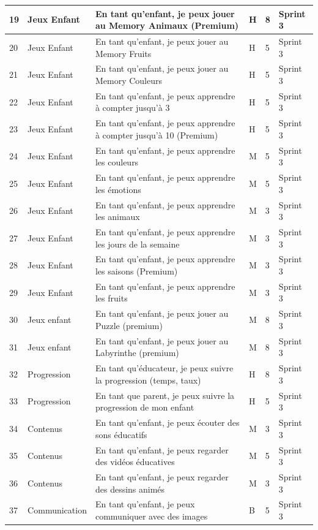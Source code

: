 \documentclass[12pt,a4paper]{report}
\begin{document}
\begin{longtable}{|p{0.5cm}|p{3cm}|p{6cm}|p{1cm}|p{1cm}|p{1.5cm}|}
19 & Jeux Enfant & En tant qu'enfant, je peux jouer au Memory Animaux (Premium) & H & 8 & Sprint 3 \\
\hline
20 & Jeux Enfant & En tant qu'enfant, je peux jouer au Memory Fruits & H & 5 & Sprint 3 \\
\hline
21 & Jeux Enfant & En tant qu'enfant, je peux jouer au Memory Couleurs & H & 5 & Sprint 3 \\
\hline
22 & Jeux Enfant & En tant qu'enfant, je peux apprendre à compter jusqu'à 3 & H & 5 & Sprint 3 \\
\hline
23 & Jeux Enfant & En tant qu'enfant, je peux apprendre à compter jusqu'à 10 (Premium) & H & 5 & Sprint 3 \\
\hline
24 & Jeux Enfant & En tant qu'enfant, je peux apprendre les couleurs & M & 5 & Sprint 3 \\
\hline
25 & Jeux Enfant & En tant qu'enfant, je peux apprendre les émotions & M & 5 & Sprint 3 \\
\hline
26 & Jeux Enfant & En tant qu'enfant, je peux apprendre les animaux & M & 3 & Sprint 3 \\
\hline
27 & Jeux Enfant & En tant qu'enfant, je peux apprendre les jours de la semaine & M & 3 & Sprint 3 \\
\hline
28 & Jeux Enfant & En tant qu'enfant, je peux apprendre les saisons (Premium) & M & 3 & Sprint 3 \\
\hline
29 & Jeux Enfant & En tant qu'enfant, je peux apprendre les fruits & M & 3 & Sprint 3 \\
\hline
30 & Jeux enfant & En tant qu'enfant, je peux jouer au Puzzle (premium) & M & 8 & Sprint 3 \\
\hline
31 & Jeux enfant & En tant qu'enfant, je peux jouer au Labyrinthe (premium) & M & 8 & Sprint 3 \\
\hline
32 & Progression & En tant qu'éducateur, je peux suivre la progression (temps, taux) & H & 8 & Sprint 3 \\
\hline
33 & Progression & En tant que parent, je peux suivre la progression de mon enfant & H & 5 & Sprint 3 \\
\hline
34 & Contenus & En tant qu'enfant, je peux écouter des sons éducatifs & M & 3 & Sprint 3 \\
\hline
35 & Contenus & En tant qu'enfant, je peux regarder des vidéos éducatives & M & 5 & Sprint 3 \\
\hline
36 & Contenus & En tant qu'enfant, je peux regarder des dessins animés & M & 3 & Sprint 3 \\
\hline
37 & Communication & En tant qu'enfant, je peux communiquer avec des images & B & 5 & Sprint 3 \\
\hline


\end{longtable}
\end{document}
